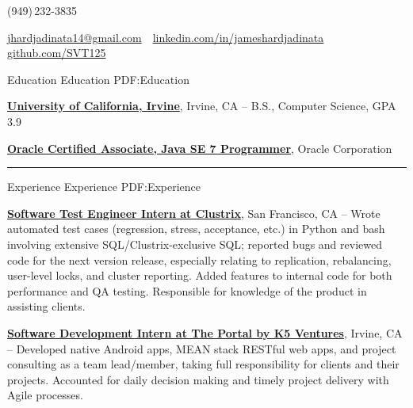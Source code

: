 \documentclass[letterpaper,MMMyyyy,nonstopmode]{simpleresumecv}
\makeatletter
\newcommand{\ResumeAuthor}{James Hardjadinata}
\newcommand{\ResumeWebsite}{github.com/SVT125}
\newcommand{\ResumeLinkedin}{linkedin.com/in/jameshardjadinata}
\newcommand{\ResumeEmail}{jhardjadinata14@gmail.com}
\makeatother
\begin{document}

\Title{\ResumeAuthor}
\begin{SubTitle}
(949)\,232-3835
\par
\href{mailto:\ResumeEmail}
{\ResumeEmail}
\,\textbullet\,
\href{\ResumeLinkedin}
{\url{\ResumeLinkedin}}\,
\,\textbullet\,
\href{\ResumeWebsite}
{\url{\ResumeWebsite}}
\end{SubTitle}

\begin{Body}


\Section
{Education}
{Education}
{PDF:Education}

\Entry
\href{https://uci.edu/}
{\textbf{University of California, Irvine}},
Irvine, CA
\hfill
{} --
\Gap
B.S., Computer Science, GPA 3.9\newline

\Entry
\href{http://education.oracle.com/pls/web_prod-plq-dad/db_pages.getpage?page_id=5001&get_params=p_exam_id:1Z0-803&p_org_id=&lang=}
{\textbf{Oracle Certified Associate, Java SE 7 Programmer}},
Oracle Corporation
\hfill
{}
\newline
\Gap

\hrule


\Section
{Experience}
{Experience}
{PDF:Experience}

\Entry
\href{http://www.clustrix.com/}
{\textbf{Software Test Engineer Intern at Clustrix}},
San Francisco, CA
\hfill
{} --
\Gap
Wrote automated test cases (regression, stress, acceptance, etc.) in Python and bash involving extensive SQL/Clustrix-exclusive
SQL; reported bugs and reviewed code for the next version release, especially relating to replication, rebalancing, user-level locks, and cluster reporting. Added features to internal code for both performance and QA
testing. Responsible for knowledge of the product in assisting clients.\newline

\Entry
\href{http://www.theportal.io/}
{\textbf{Software Development Intern at The Portal by K5 Ventures}},
Irvine, CA
\hfill
{} --
\Gap
Developed native Android apps, MEAN stack RESTful web apps, and project consulting as a team lead/member, taking full
responsibility for clients and their projects. Accounted for daily decision making and timely project delivery with Agile processes.\newline


\end{Body}
\end{document}
